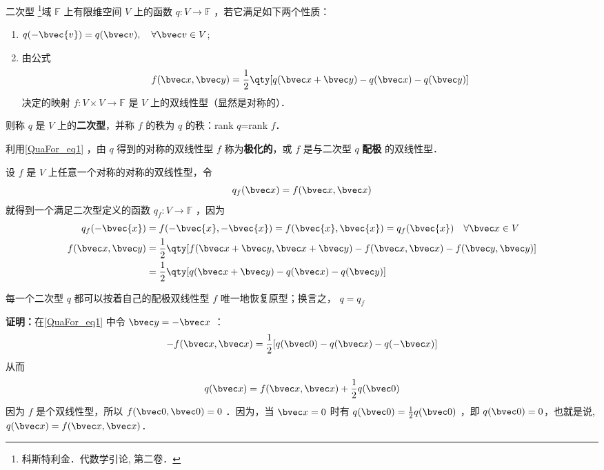 
\begin{definition}{二次型}
\footnote{科斯特利金．代数学引论, 第二卷．}域 $\mathbb{F}$ 上有限维空间 $V$ 上的函数 $q:V\rightarrow\mathbb{F}$ ，若它满足如下两个性质：
\begin{enumerate}
\item $q(-\bvec{v})=q(\bvec v),\quad \forall\bvec v\in V$;
\item 由公式
\begin{equation}\label{QuaFor_eq1}
f(\bvec x,\bvec y)=\frac{1}{2}\qty[q(\bvec x+\bvec y)-q(\bvec x)-q(\bvec y)]
\end{equation}
决定的映射 $f:V\times V\rightarrow\mathbb{F}$ 是 $V$ 上的双线性型（显然是对称的）．
\end{enumerate}
则称 $q$ 是 $V$ 上的\textbf{二次型}，并称 $f$ 的秩为 $q$ 的秩：rank $q$=rank $f$．
\end{definition}
利用\autoref{QuaFor_eq1} ，由 $q$ 得到的对称的双线性型 $f$ 称为\textbf{极化的}，或 $f$ 是与二次型 $q$ \textbf{配极} 的双线性型．
\begin{example}{}
设 $f$ 是 $V$ 上任意一个对称的对称的双线性型，令
\begin{equation}
q_f(\bvec x)=f(\bvec x,\bvec x)
\end{equation}
就得到一个满足二次型定义的函数 $q_f:V\rightarrow\mathbb{F}$ ，因为
\begin{equation}
\begin{aligned}
q_f(-\bvec{x})&=f(-\bvec{x},-\bvec{x})=f(\bvec{x},\bvec{x})=q_f(\bvec{x}) \quad \forall\bvec x\in V\\
f(\bvec x,\bvec y)&=\frac{1}{2}\qty[f(\bvec x+\bvec y,\bvec x+\bvec y)-f(\bvec x,\bvec x)-f(\bvec y,\bvec y)]\\
&=\frac{1}{2}\qty[q(\bvec x+\bvec y)-q(\bvec x)-q(\bvec y)]
\end{aligned}
\end{equation}
\end{example}
\begin{theorem}{}\label{QuaFor_the1}
每一个二次型 $q$ 都可以按着自己的配极双线性型 $f$ 唯一地恢复原型；换言之， $q=q_f$
\end{theorem}
\textbf{证明：}在\autoref{QuaFor_eq1} 中令 $\bvec y=-\bvec x$ ：
\begin{equation}
-f(\bvec x,\bvec x)=\frac{1}{2}[q(\bvec 0)-q(\bvec x)-q(-\bvec x)]
\end{equation}
从而
\begin{equation}
q(\bvec x)=f(\bvec x,\bvec x)+\frac{1}{2}q(\bvec 0)
\end{equation}
因为 $f$ 是个双线性型，所以 $f(\bvec 0,\bvec 0)=0$ ．因为，当 $\bvec x=0$ 时有 $q(\bvec 0)=\frac{1}{2}q(\bvec 0)$ ，即 $q(\bvec 0)=0$，也就是说, $q(\bvec x)=f(\bvec x,\bvec x)$．

